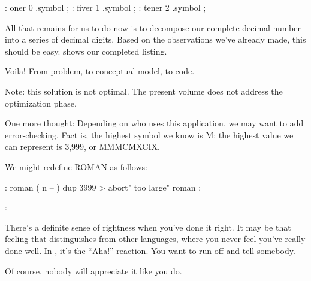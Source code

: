\begin{Code}
: oner    0 .symbol ;
: fiver   1 .symbol ;
: tener   2 .symbol ;
\end{Code}
All that remains for us to do now is to decompose our complete decimal
number into a series of decimal digits. Based on the observations we've
already made, this should be easy.  shows our completed
listing.

Voila! From problem, to conceptual model, to code.

Note: this solution is not optimal. The present volume does not address
the optimization phase.

One more thought: Depending on who uses this application, we may
want to add error-checking. Fact is, the highest symbol we know is M; the
highest value we can represent is 3,999, or MMMCMXCIX.

\goodbreak
We might redefine ROMAN as follows:

\begin{Code}
: roman  ( n -- )
   dup  3999 >  abort" too large"  roman ;
\end{Code}

\begin{interview}
:

\begin{tfquot}
There's a definite sense of rightness when you've done it right. It may be
that feeling that distinguishes \Forth{} from other languages, where you
never feel you've really done well. In \Forth{}, it's the ``Aha!''
reaction. You want to run off and tell somebody.

Of course, nobody will appreciate it like you do.
\end{tfquot}
\end{interview}

